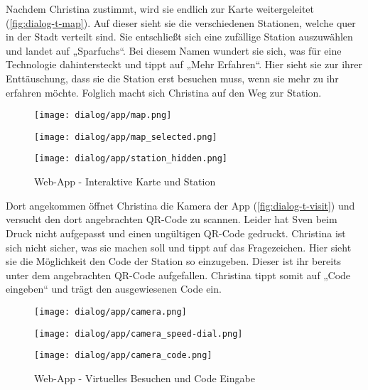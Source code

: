 Nachdem Christina zustimmt, wird sie endlich zur Karte weitergeleitet (\autoref{fig:dialog-t-map}). Auf dieser sieht sie die verschiedenen Stationen,
welche quer in der Stadt verteilt sind. Sie entschließt sich eine zufällige
Station auszuwählen und landet auf „Sparfuchs“. Bei diesem Namen wundert sie
sich, was für eine Technologie dahintersteckt und tippt auf „Mehr Erfahren“.
Hier sieht sie zur ihrer Enttäuschung, dass sie die Station erst besuchen muss,
wenn sie mehr zu ihr erfahren möchte. Folglich macht sich Christina auf den Weg
zur Station.

\begin{figure}[htpb]
    \centering
    \begin{minipage}{.325\textwidth}
        \centering
        \texttt{[image: dialog/app/map.png]}
    \end{minipage}%
    \begin{minipage}{.325\textwidth}
        \centering
        \texttt{[image: dialog/app/map\_selected.png]}
    \end{minipage}
    \begin{minipage}{.325\textwidth}
        \centering
        \texttt{[image: dialog/app/station\_hidden.png]}
    \end{minipage}
    \caption{Web-App - Interaktive Karte und Station}
    \label{fig:dialog-t-map}
\end{figure}

Dort angekommen öffnet Christina die Kamera der App (\autoref{fig:dialog-t-visit}) und versucht den dort angebrachten QR-Code zu
scannen. Leider hat Sven beim Druck nicht aufgepasst und einen ungültigen
QR-Code gedruckt. Christina ist sich nicht sicher, was sie machen soll und tippt
auf das Fragezeichen. Hier sieht sie die Möglichkeit den Code der Station so
einzugeben. Dieser ist ihr bereits unter dem angebrachten QR-Code aufgefallen.
Christina tippt somit auf „Code eingeben“ und trägt den ausgewiesenen Code ein.

\begin{figure}[htpb]
    \centering
    \begin{minipage}{.325\textwidth}
        \centering
        \texttt{[image: dialog/app/camera.png]}
    \end{minipage}%
    \begin{minipage}{.325\textwidth}
        \centering
        \texttt{[image: dialog/app/camera\_speed-dial.png]}
    \end{minipage}
    \begin{minipage}{.325\textwidth}
        \centering
        \texttt{[image: dialog/app/camera\_code.png]}
    \end{minipage}
    \caption{Web-App - Virtuelles Besuchen und Code Eingabe}
    \label{fig:dialog-t-visit}
\end{figure}

